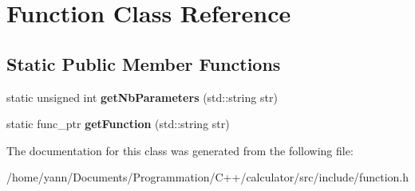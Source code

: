\hypertarget{class_function}{\section{Function Class Reference}
\label{class_function}
}
\subsection*{Static Public Member Functions}
\begin{DoxyCompactItemize}
\item 
\hypertarget{class_function_af94043af6732cf11fb8210d1f79ad66a}{static unsigned int {\bfseries get\-Nb\-Parameters} (std\-::string str)}\label{class_function_af94043af6732cf11fb8210d1f79ad66a}

\item 
\hypertarget{class_function_a729042286d2b314dd4f5f5bb1394f4f0}{static func\-\_\-ptr {\bfseries get\-Function} (std\-::string str)}\label{class_function_a729042286d2b314dd4f5f5bb1394f4f0}

\end{DoxyCompactItemize}


The documentation for this class was generated from the following file\-:\begin{DoxyCompactItemize}
\item 
/home/yann/\-Documents/\-Programmation/\-C++/calculator/src/include/function.\-h\end{DoxyCompactItemize}
